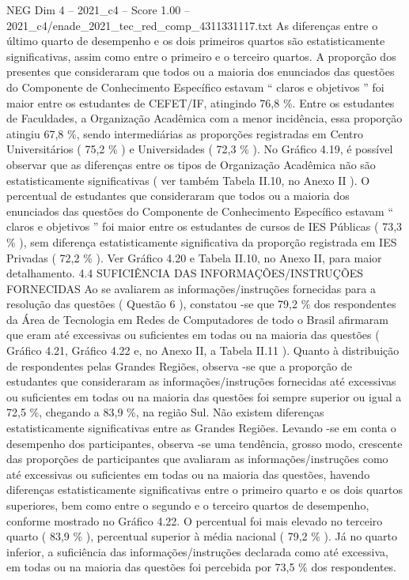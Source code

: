\begin{textsample}{NEG Dim 4 – 2021\_c4 – Score 1.00 – 2021\_c4/enade\_2021\_tec\_red\_comp\_4311331117.txt}
As diferenças entre o último quarto de desempenho e os dois primeiros quartos são estatisticamente significativas, assim como entre o primeiro e o terceiro quartos.
A proporção dos presentes que consideraram que todos ou a maioria dos enunciados das questões do Componente de Conhecimento Específico estavam “ claros e objetivos ” foi maior entre os estudantes de CEFET/IF, atingindo 76,8 \%.
Entre os estudantes de Faculdades, a Organização Acadêmica com a menor incidência, essa proporção atingiu 67,8 \%, sendo intermediárias as proporções registradas em Centro Universitários ( 75,2 \% ) e Universidades ( 72,3 \% ).
No Gráfico 4.19, é possível observar que as diferenças entre os tipos de Organização Acadêmica não são estatisticamente significativas ( ver também Tabela II.10, no Anexo II ).
O percentual de estudantes que consideraram que todos ou a maioria dos enunciados das questões do Componente de Conhecimento Específico estavam “ claros e objetivos ” foi maior entre os estudantes de cursos de IES Públicas ( 73,3 \% ), sem diferença estatisticamente significativa da proporção registrada em IES Privadas ( 72,2 \% ).
Ver Gráfico 4.20 e Tabela II.10, no Anexo II, para maior detalhamento. 4.4 SUFICIÊNCIA DAS INFORMAÇÕES/INSTRUÇÕES FORNECIDAS Ao se avaliarem as informações/instruções fornecidas para a resolução das questões ( Questão 6 ), constatou -se que 79,2 \% dos respondentes da Área de Tecnologia em Redes de Computadores de todo o Brasil afirmaram que eram até excessivas ou suficientes em todas ou na maioria das questões ( Gráfico 4.21, Gráfico 4.22 e, no Anexo II, a Tabela II.11 ).
Quanto à distribuição de respondentes pelas Grandes Regiões, observa -se que a proporção de estudantes que consideraram as informações/instruções fornecidas até excessivas ou suficientes em todas ou na maioria das questões foi sempre superior ou igual a 72,5 \%, chegando a 83,9 \%, na região Sul.
Não existem diferenças estatisticamente significativas entre as Grandes Regiões.
Levando -se em conta o desempenho dos participantes, observa -se uma tendência, grosso modo, crescente das proporções de participantes que avaliaram as informações/instruções como até excessivas ou suficientes em todas ou na maioria das questões, havendo diferenças estatisticamente significativas entre o primeiro quarto e os dois quartos superiores, bem como entre o segundo e o terceiro quartos de desempenho, conforme mostrado no Gráfico 4.22.
O percentual foi mais elevado no terceiro quarto ( 83,9 \% ), percentual superior à média nacional ( 79,2 \% ).
Já no quarto inferior, a suficiência das informações/instruções declarada como até excessiva, em todas ou na maioria das questões foi percebida por 73,5 \% dos respondentes.

\end{textsample}
